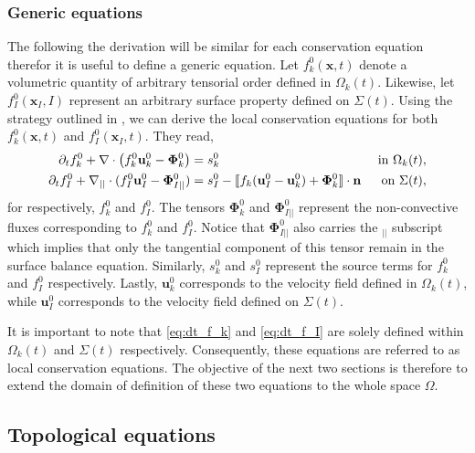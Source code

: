 \subsubsection{Generic equations}

The following the derivation will be similar for each conservation equation therefor it is useful to define a generic equation.
Let $f_k^0(\textbf{x},t)$ denote a volumetric quantity of arbitrary tensorial order defined in $\Omega_k(t)$.
Likewise, let $f_I^0(\textbf{x}_I,I)$ represent an arbitrary surface property defined on $\Sigma(t)$.
Using the strategy outlined in \citep{bothe2022sharp,morel2015mathematical,slattery2007interfacial}, we can derive the local conservation equations for both $f_k^0(\textbf{x},t)$ and $f_I^0(\textbf{x}_I,t)$.
They read,  
\begin{align}
    \label{eq:dt_f_k}
    \partial_t f_k^0
    +\mathbf{\nabla}\cdot \left(
        f_k^0\textbf{u}_k^0
        - \mathbf{\Phi}_k^0
        \right)
    &= 
    s_k^0
    & \text{ in } \Omega_k(t),&\\
    \partial_t f_I^0 
    +\mathbf{\nabla}_{||}\cdot
    (
        f_I^0 \textbf{u}_I^0
        - \mathbf{\Phi}_{I||}^0 
    )
    &= 
    s_I^0
    - \llbracket 
        f_k (\textbf{u}_I^0 - \textbf{u}_k^0)
        + \mathbf{\Phi}_k^0
      \rrbracket \cdot \textbf{n} 
    & \text{ on } \Sigma(t),&
    \label{eq:dt_f_I}
\end{align}
for respectively, $f_k^0$ and $f_I^0$.
The tensors $\mathbf{\Phi}_k^0$ and $\mathbf{\Phi}_{I||}^0$ represent the non-convective fluxes corresponding to $f_k^0$ and $f_I^0$. 
Notice that $\mathbf{\Phi}_{I||}^0$ also carries the $_{||}$ subscript which implies that only the tangential component of this tensor remain in the surface balance equation. 
Similarly, $s_k^0$ and $s_I^0$ represent the source terms for $f_k^0$ and $f_I^0$ respectively.
Lastly, $\textbf{u}_k^0$ corresponds to the velocity field defined in $\Omega_k(t)$, while $\textbf{u}_I^0$ corresponds to the velocity field defined on $\Sigma(t)$.


It is important to note that \ref{eq:dt_f_k} and \ref{eq:dt_f_I} are solely defined within $\Omega_k(t)$ and $\Sigma(t)$ respectively.
Consequently, these equations are referred to as local conservation equations.
The objective of the next two sections is therefore to extend the domain of definition of these two equations to the whole space $\Omega$.

\subsection{Topological equations}

